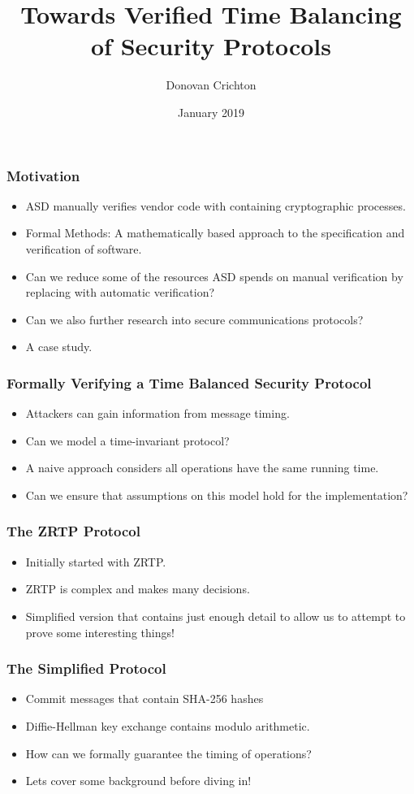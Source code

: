 \documentclass{beamer}
\title{Towards Verified Time Balancing of Security Protocols}
\author{Donovan Crichton}
\date{January 2019}
\begin{document}
 
\frame{\titlepage}

\begin{frame}[fragile]
  \frametitle{Motivation}
  \begin{itemize}
    \item ASD manually verifies vendor code with containing 
          cryptographic processes.
    \item Formal Methods: A mathematically based approach to the
            specification and verification of software.
    \item Can we reduce some of the resources ASD spends on 
            manual verification by replacing with automatic 
            verification?
    \item Can we also further research into secure communications
          protocols?
    \item A case study.
  \end{itemize}
\end{frame}

\begin{frame}[fragile]
  \frametitle{Formally Verifying a Time Balanced Security Protocol}
  \begin{itemize}
    \item Attackers can gain information from message timing.
    \item Can we model a time-invariant protocol?
    \item A naive approach considers all operations have the 
          same running time.
    \item Can we ensure that assumptions on this model hold for the
            implementation?
  \end{itemize}
\end{frame}

\begin{frame}[fragile]
  \frametitle{The ZRTP Protocol}
  \begin{itemize}
    \item Initially started with ZRTP.
    \item ZRTP is complex and makes many decisions.
    \item Simplified version that contains just enough detail to 
            allow us to attempt to prove some interesting things!
  \end{itemize}
\end{frame}

\begin{frame}[fragile]
  \frametitle{The Simplified Protocol}
    \begin{itemize}
      \item Commit messages that contain SHA-256 hashes
      \item Diffie-Hellman key exchange contains modulo arithmetic.
      \item How can we formally guarantee the timing of operations?
      \item Lets cover some background before diving in!
    \end{itemize}
\end{frame}
\end{document}
